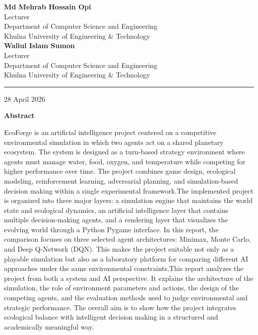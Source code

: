 \documentclass[12pt,a4paper]{article}
\begin{document}
\begin{titlepage}
\begin{minipage}[t]{0.45\textwidth}
\textbf{Md Mehrab Hossain Opi}\\
Lecturer\\
Department of Computer Science and Engineering\\
Khulna University of Engineering \& Technology\\[0.35cm]

\textbf{Waliul Islam Sumon}\\
Lecturer\\
Department of Computer Science and Engineering\\
Khulna University of Engineering \& Technology
\end{minipage}

\vfill

\rule{\textwidth}{0.8pt}

\vspace{0.25cm}

{\small 28 April 2026}

\end{titlepage}

\clearpage
\thispagestyle{empty}
\begin{center}
    {\LARGE\bfseries Abstract}
\end{center}
\vspace{0.8cm}

\onehalfspacing
EcoForge is an artificial intelligence project centered on a competitive environmental simulation in which two agents act on a shared planetary ecosystem. The system is designed as a turn-based strategy environment where agents must manage water, food, oxygen, and temperature while competing for higher performance over time. The project combines game design, ecological modeling, reinforcement learning, adversarial planning, and simulation-based decision making within a single experimental framework.The implemented project is organized into three major layers: a simulation engine that maintains the world state and ecological dynamics, an artificial intelligence layer that contains multiple decision-making agents, and a rendering layer that visualizes the evolving world through a Python Pygame interface. In this report, the comparison focuses on three selected agent architectures: Minimax, Monte Carlo, and Deep Q-Network (DQN). This makes the project suitable not only as a playable simulation but also as a laboratory platform for comparing different AI approaches under the same environmental constraints.This report analyzes the project from both a system and AI perspective. It explains the architecture of the simulation, the role of environment parameters and actions, the design of the competing agents, and the evaluation methods used to judge environmental and strategic performance. The overall aim is to show how the project integrates ecological balance with intelligent decision making in a structured and academically meaningful way.
\singlespacing
\end{document}
